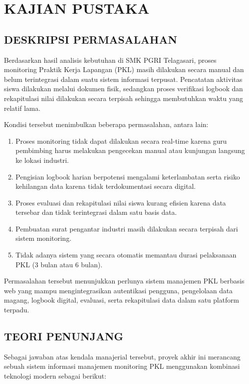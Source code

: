 \chapter{KAJIAN PUSTAKA}

\section{DESKRIPSI PERMASALAHAN}

Berdasarkan hasil analisis kebutuhan di SMK PGRI Telagasari, proses monitoring Praktik Kerja Lapangan (PKL) masih dilakukan secara manual dan belum terintegrasi dalam suatu sistem informasi terpusat. Pencatatan aktivitas siswa dilakukan melalui dokumen fisik, sedangkan proses verifikasi logbook dan rekapitulasi nilai dilakukan secara terpisah sehingga membutuhkan waktu yang relatif lama.

Kondisi tersebut menimbulkan beberapa permasalahan, antara lain:

\begin{enumerate}[label=\arabic*.]
\item Proses monitoring tidak dapat dilakukan secara real-time karena guru pembimbing harus melakukan pengecekan manual atau kunjungan langsung ke lokasi industri.
\item Pengisian logbook harian berpotensi mengalami keterlambatan serta risiko kehilangan data karena tidak terdokumentasi secara digital.
\item Proses evaluasi dan rekapitulasi nilai siswa kurang efisien karena data tersebar dan tidak terintegrasi dalam satu basis data.
\item Pembuatan surat pengantar industri masih dilakukan secara terpisah dari sistem monitoring.
\item Tidak adanya sistem yang secara otomatis memantau durasi pelaksanaan PKL (3 bulan atau 6 bulan).
\end{enumerate}

Permasalahan tersebut menunjukkan perlunya sistem manajemen PKL berbasis web yang mampu mengintegrasikan autentikasi pengguna, pengelolaan data magang, logbook digital, evaluasi, serta rekapitulasi data dalam satu platform terpadu.

\section{TEORI PENUNJANG}

Sebagai jawaban atas kendala manajerial tersebut, proyek akhir ini merancang sebuah sistem informasi manajemen monitoring PKL menggunakan kombinasi teknologi modern sebagai berikut:

